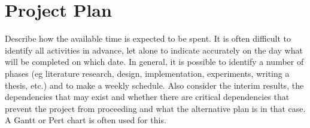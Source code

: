 \section{Project Plan}
\label{sec:project_plan}
 Describe how the available time is expected to be spent. It is often difficult to identify
all activities in advance, let alone to indicate accurately on the day what will be completed on which
date. In general, it is possible to identify a number of phases (eg literature research, design,
implementation, experiments, writing a thesis, etc.) and to make a weekly schedule. Also consider
the interim results, the dependencies that may exist and whether there are critical dependencies
that prevent the project from proceeding and what the alternative plan is in that case. A Gantt or
Pert chart is often used for this.


\begin{center}
    \begin{chronology}[1]{0}{13}{60ex}[\linewidth]
    \end{chronology}
\end{center}

\newpage

